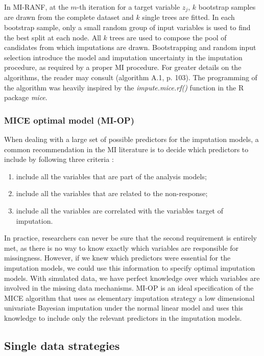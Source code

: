 	In MI-RANF, at the $m$-th iteration for a target variable $z_j$, $k$ bootstrap samples are drawn from the complete 
	dataset and $k$ single trees are fitted.
	In each bootstrap sample, only a small random group of input variables is used to find the best split at each node.
	All $k$ trees are used to compose the pool of candidates from which imputations are drawn.
	Bootstrapping and random input selection introduce the model and imputation uncertainty in the imputation procedure,
	as required by a proper MI procedure.
	For greater details on the algorithms, the reader may consult \cite{dooveEtAl:2014} (algorithm A.1, p. 103).
	The programming of the algorithm was heavily inspired by the \emph{impute.mice.rf()} function in the 
	R package \emph{mice}.

\subsubsection{MICE optimal model (MI-OP)}
	When dealing with a large set of possible predictors for the imputation models, a common recommendation in the MI 
	literature is to decide which predictors to include by following three criteria \citep[p. 168]{vanBuuren:2018}:
	\begin{enumerate}

	\item include all the variables that are part of the analysis models;
	\item include all the variables that are related to the non-response;
	\item include all the variables are correlated with the variables target of imputation.

	\end{enumerate}

	In practice, researchers can never be sure that the second requirement is entirely met, as there is no way to know exactly 
	which variables are responsible for missingness.
	However, if we knew which predictors were essential for the imputation models, we could use this information to specify 
	optimal imputation models.
	With simulated data, we have perfect knowledge over which variables are involved in the missing data mechanisms.
	MI-OP is an ideal specification of the MICE algorithm that uses as elementary imputation strategy a low dimensional 
	univariate Bayesian imputation under the normal linear model and uses this knowledge to include only the relevant 
	predictors in the imputation models.
	
\subsection{Single data strategies}

